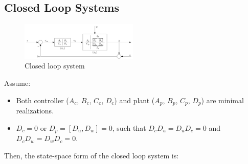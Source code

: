 \documentclass[letterpaper,12pt]{article}
\begin{document}
\subsection{Closed Loop Systems}
\begin{figure}[h]
    \centering
    \includegraphics[width=0.5\textwidth]{closed loop diagram.png}
    \caption{Closed loop system}
\end{figure}
Assume:
\begin{itemize}
    \item Both controller ($A_c$, $B_c$, $C_c$, $D_c$) and plant ($A_p$, $B_p$, $C_p$, $D_p$) are minimal realizations.
    \item $D_c= 0$ or $D_p = [D_u, D_w] = 0$, such that $D_c D_u = D_u D_c = 0$ and $D_c D_w = D_w D_c = 0$.
\end{itemize}
Then, the state-space form of the closed loop system is:
\end{document}
